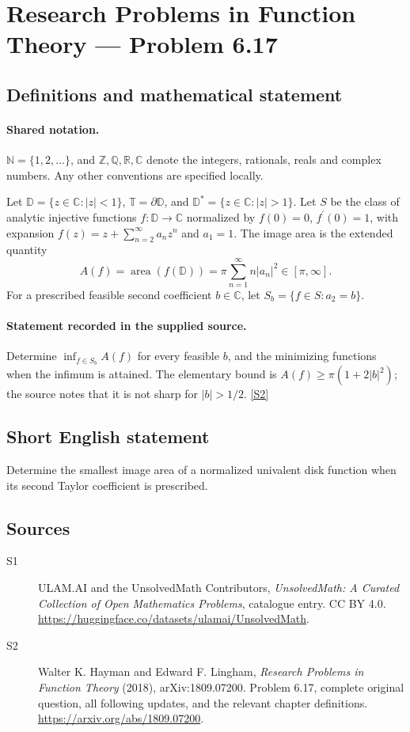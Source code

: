 \documentclass[11pt]{book}
\newcommand{\sref}[2]{\hyperlink{source:#1:#2}{[S#2]}}
\begin{document}
\section{Research Problems in Function Theory — Problem 6.17}\label{statement}

\subsection{Definitions and mathematical statement}

\paragraph{Shared notation.}$\mathbb N=\{1,2,\ldots\}$, and $\mathbb Z,\mathbb Q,\mathbb R,\mathbb C$ denote the integers, rationals, reals and complex numbers. Any other conventions are specified locally.


Let $\mathbb D=\{z\in\mathbb C:|z|<1\}$, $\mathbb T=\partial\mathbb D$, and $\mathbb D^*=\{z\in\mathbb C:|z|>1\}$. Let $S$ be the class of analytic injective functions $f:\mathbb D\to\mathbb C$ normalized by $f(0)=0$, $f^{\prime}(0)=1$, with expansion $f(z)=z+\sum_{n=2}^{\infty}a_nz^n$ and $a_1=1$. The image area is the extended quantity \[A(f)=\operatorname{area}(f(\mathbb D))=\pi\sum_{n=1}^{\infty}n|a_n|^2\in[\pi,\infty].\] For a prescribed feasible second coefficient $b\in\mathbb C$, let $S_b=\{f\in S:a_2=b\}$.
\paragraph{Statement recorded in the supplied source.}
Determine $\inf_{f\in S_b}A(f)$ for every feasible $b$, and the minimizing functions when the infimum is attained. The elementary bound is $A(f)\ge\pi(1+2|b|^2)$; the source notes that it is not sharp for $|b|>1/2$. \sref{statement}{2}
\subsection{Short English statement}
Determine the smallest image area of a normalized univalent disk function when its second Taylor coefficient is prescribed.
\subsection{Sources}
\begin{description}
\item[\hypertarget{source:statement:1}{S1}] ULAM.AI and the UnsolvedMath Contributors, \emph{UnsolvedMath: A Curated Collection of Open Mathematics Problems}, catalogue entry. CC BY 4.0. \url{https://huggingface.co/datasets/ulamai/UnsolvedMath}.
\item[\hypertarget{source:statement:2}{S2}] Walter K. Hayman and Edward F. Lingham, \emph{Research Problems in Function Theory} (2018), arXiv:1809.07200. Problem 6.17, complete original question, all following updates, and the relevant chapter definitions. \url{https://arxiv.org/abs/1809.07200}.
\end{description}
\label{end:statement}
\end{document}
